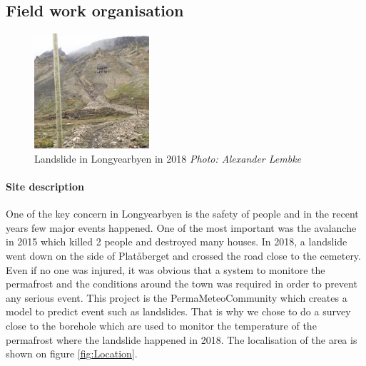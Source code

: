 \newpage
\subsection{Field work organisation}

\begin{figure}
    \centering
    \includegraphics[width=0.38\textwidth]{Images/00_Methodology/LandSlide2018.jpg}
    \caption{Landslide in Longyearbyen in 2018 \emph{Photo: Alexander Lembke} \cite{Landslide2018Longyeabyen}}
    \label{fig:Landslide2018}
\end{figure}

\paragraph{Site description} \label{Paragraph:SiteDescription}

One of the key concern in Longyearbyen is the safety of people and in the recent years few major events happened. One of the most important was the avalanche in 2015 which killed 2 people and destroyed many houses. In 2018, a landslide went down on the side of Platåberget and crossed the road close to the cemetery. Even if no one was injured, it was obvious that a system to monitore the permafrost and the conditions around the town was required in order to prevent any serious event. This project is the PermaMeteoCommunity \cite{PermaMeteoCommunity} which creates a model to predict event such as landslides. That is why we chose to do a survey close to the borehole which are used to monitor the temperature of the permafrost where the landslide happened in 2018. The localisation of the area is shown on figure \ref{fig:Location}.




